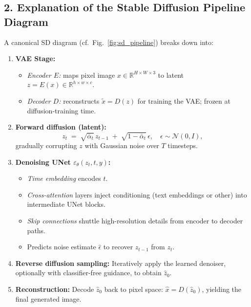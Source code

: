 \subsection*{2. Explanation of the Stable Diffusion Pipeline Diagram}
A canonical SD diagram (cf.\ Fig.~\ref{fig:sd_pipeline}) breaks down into:
\begin{enumerate}
  \item \textbf{VAE Stage:}  
    \begin{itemize}
      \item \emph{Encoder $E$:} maps pixel image $x\in\mathbb{R}^{H\times W\times3}$ to latent $z=E(x)\in\mathbb{R}^{h\times w\times c}$.  
      \item \emph{Decoder $D$:} reconstructs $\tilde x=D(z)$ for training the VAE; frozen at diffusion-training time.
    \end{itemize}
  \item \textbf{Forward diffusion (latent):}  
    \[
      z_t \;=\;\sqrt{\bar\alpha_t}\,z_{t-1}\;+\;\sqrt{1-\bar\alpha_t}\,\epsilon,\quad \epsilon\!\sim\!\mathcal{N}(0,I),
    \]
    gradually corrupting $z$ with Gaussian noise over $T$ timesteps.
  \item \textbf{Denoising UNet $\varepsilon_\theta(z_t,t,y)$:}  
    \begin{itemize}
      \item \emph{Time embedding} encodes $t$.  
      \item \emph{Cross-attention} layers inject conditioning (text embeddings or other) into intermediate UNet blocks.  
      \item \emph{Skip connections} shuttle high-resolution details from encoder to decoder paths.  
      \item Predicts noise estimate $\hat\epsilon$ to recover $z_{t-1}$ from $z_t$.
    \end{itemize}
  \item \textbf{Reverse diffusion sampling:}  
    Iteratively apply the learned denoiser, optionally with classifier-free guidance, to obtain $\hat z_0$.
  \item \textbf{Reconstruction:}  
    Decode $\hat z_0$ back to pixel space: $\hat x = D(\hat z_0)$, yielding the final generated image.
\end{enumerate}

